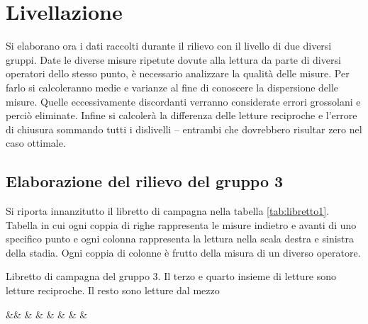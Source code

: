 \chapter{Livellazione}\label{cap:cap2}
\newcommand{\libretto}[3]{%
\begin{table}[htb]\footnotesize
\caption{#1}
\label{#2}
\centering
\csvreader[centered tabular=c@{}SSSSSSSS,
	table head=\toprule &$\mathbf{L_{dx}}$ & $\mathbf{L_{sx}}$ & $\mathbf{L_{dx}}$ %
	& $\mathbf{L_{sx}}$ & $\mathbf{L_{dx}}$ & $\mathbf{L_{sx}}$ & $\mathbf{L_{dx}}$ & $\mathbf{L_{sx}}$ \\\midrule,
	table foot = \bottomrule]%
	{#3}{}%
	{&\csvcoli & \csvcolii & \csvcoliii & %
	\csvcoliv & \csvcolv & \csvcolvi & %
	\csvcolvii & \csvcolviii}
\end{table}}
\newcommand{\elaborazione}[3]{%
\begin{table}[htbp]\footnotesize
\caption{#1}
\label{#2}
\centering
\csvreader[centered tabular=c@{}rSSSSSSSS,
	no head, %
	table head=\toprule &&$\mathbf{1}$ & $\mathbf{2}$ & $\mathbf{3}$ %
	& $\mathbf{4}$ & $\mathbf{5}$ & $\mathbf{6}$ & $\mathbf{7}$ & $\mathbf{8}$ \\\midrule,
	table foot = \bottomrule]%
	{#3}{}%
	{&\textbf{\csvcolix} & \csvcoli & \csvcolii & \csvcoliii & %
	\csvcoliv & \csvcolv & \csvcolvi & %
	\csvcolvii & \csvcolviii}
\end{table}}
Si elaborano ora i dati raccolti durante il rilievo con il livello di due diversi gruppi. 
Date le diverse misure ripetute dovute alla lettura da parte di diversi operatori dello stesso punto, è necessario analizzare la qualità delle misure. 
Per farlo si calcoleranno medie e varianze al fine di conoscere la dispersione delle misure. 
Quelle eccessivamente discordanti verranno considerate errori grossolani e perciò eliminate. 
Infine si calcolerà la differenza delle letture reciproche e  l'errore di chiusura sommando tutti i dislivelli -- entrambi che dovrebbero risultar zero nel caso ottimale.
\section{Elaborazione del rilievo del gruppo 3}
Si riporta innanzitutto il libretto di campagna nella tabella \ref{tab:libretto1}.
Tabella in cui ogni coppia di righe rappresenta le misure indietro e avanti di uno specifico punto e ogni colonna rappresenta la lettura nella scala destra e sinistra della stadia.
Ogni coppia di colonne è frutto della misura di un diverso operatore. 
\libretto{Libretto di campagna del gruppo 3. Il terzo e quarto insieme di letture sono letture reciproche. Il resto sono letture dal mezzo}{tab:libretto1}{documents/livLibretto1.csv}

